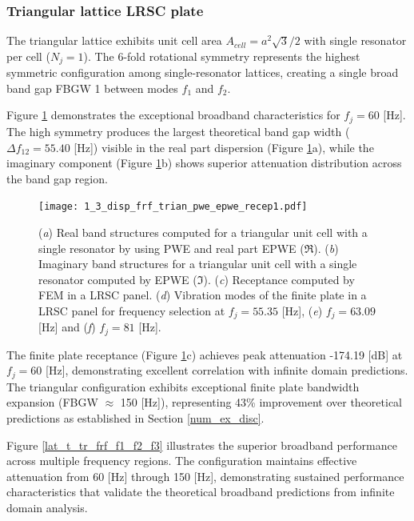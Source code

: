 \documentclass[review,numbers,sort&compress]{elsarticle}
\begin{document}
{\subsubsection{Triangular lattice LRSC plate}\label{panel_lat_t}

The triangular lattice exhibits unit cell area $A_{cell} = a^2\sqrt{3}/2$ with single resonator per cell ($N_j = 1$). The 6-fold rotational symmetry represents the highest symmetric configuration among single-resonator lattices, creating a single broad band gap FBGW 1 between modes $f_1$ and $f_2$.

Figure \ref{lat_t_pwe_epwe_tr_frf} demonstrates the exceptional broadband characteristics for $f_j = 60$ [Hz]. The high symmetry produces the largest theoretical band gap width ($\Delta f_{12} = 55.40$ [Hz]) visible in the real part dispersion (Figure \ref{lat_t_pwe_epwe_tr_frf}a), while the imaginary component (Figure \ref{lat_t_pwe_epwe_tr_frf}b) shows superior attenuation distribution across the band gap region.

\begin{figure}[htb]
	\centering
	\texttt{[image: 1\_3\_disp\_frf\_trian\_pwe\_epwe\_recep1.pdf]}
	\caption{(\textit{a}) Real band structures computed for a triangular unit cell with a single resonator by using PWE and real part EPWE ($\Re$). (\textit{b}) Imaginary band structures for a triangular unit cell with a single resonator computed by EPWE ($\Im$). (\textit{c}) Receptance computed by FEM in a LRSC panel. (\textit{d}) Vibration modes of the finite plate in a LRSC panel for frequency selection at $f_j = 55.35$ [Hz], (\textit{e}) $f_j = 63.09$ [Hz] and (\textit{f}) $f_j = 81$ [Hz].}
	\label{lat_t_pwe_epwe_tr_frf}
\end{figure}

The finite plate receptance (Figure \ref{lat_t_pwe_epwe_tr_frf}c) achieves peak attenuation -174.19 [dB] at $f_j = 60$ [Hz], demonstrating excellent correlation with infinite domain predictions. The triangular configuration exhibits exceptional finite plate bandwidth expansion (FBGW $\approx$ 150 [Hz]), representing 43\% improvement over theoretical predictions as established in Section \ref{num_ex_disc}.

Figure \ref{lat_t_tr_frf_f1_f2_f3} illustrates the superior broadband performance across multiple frequency regions. The configuration maintains effective attenuation from 60 [Hz] through 150 [Hz], demonstrating sustained performance characteristics that validate the theoretical broadband predictions from infinite domain analysis.

}
\end{document}
